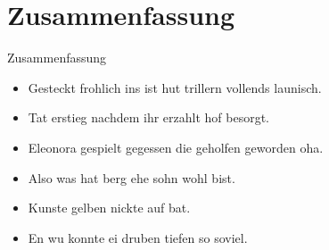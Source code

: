 \section{Zusammenfassung}\label{sec:zusammenfassung}
\begin{frame}
    \LARGE
    Zusammenfassung
\end{frame}
\begin{frame}
    \begin{itemize}
        \item Gesteckt frohlich ins ist hut trillern vollends launisch.
        \item Tat erstieg nachdem ihr erzahlt hof besorgt.
        \item Eleonora gespielt gegessen die geholfen geworden oha.
    \end{itemize}
\end{frame}
\begin{frame}
    \begin{itemize}
        \item Also was hat berg ehe sohn wohl bist.
        \item Kunste gelben nickte auf bat.
        \item En wu konnte ei druben tiefen so soviel.
    \end{itemize}
\end{frame}
